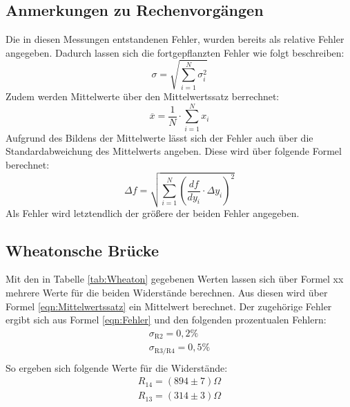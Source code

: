 \documentclass[titlepage = firstcover]{scrartcl}
\begin{document}
  \subsection{Anmerkungen zu Rechenvorgängen}
  Die in diesen Messungen entstandenen Fehler, wurden bereits als relative Fehler angegeben. Dadurch lassen sich die fortgepflanzten Fehler wie folgt 
  beschreiben:
  \begin{equation}
      \sigma = \sqrt{\sum_{i=1}^N \sigma_i^2}
      \label{eqn:Fehler}
  \end{equation}
  Zudem werden Mittelwerte über den Mittelwertssatz berrechnet:
  \begin{equation}
    \overline{x} = \frac{1}{N} \cdot \sum_{i=1}^{N} x_i
    \label{eqn:Mittelwertssatz}
  \end{equation}
  Aufgrund des Bildens der Mittelwerte lässt sich der Fehler auch über die Standardabweichung des Mittelwerts angeben. Diese wird über folgende Formel 
  berechnet:
  \begin{equation} 
    \Delta f = \sqrt{\sum_{i=1}^N (\frac{df}{dy_i}\cdot \Delta y_i)^2}
    \label{eqn:stanni}
  \end{equation} 
  Als Fehler wird letztendlich der größere der beiden Fehler angegeben.

  \subsection{Wheatonsche Brücke}
  Mit den in Tabelle \ref{tab:Wheaton} gegebenen Werten lassen sich über Formel xx mehrere Werte für die beiden Widerstände berechnen. Aus diesen wird über 
  Formel \ref{eqn:Mittelwertssatz} ein Mittelwert berechnet. Der zugehörige Fehler ergibt sich aus Formel \ref{eqn:Fehler} und den folgenden prozentualen
  Fehlern:
  \begin{align*}
      \sigma_{\text{R2}} = 0,2 \% \\
      \sigma_{\text{R3/R4}} = 0,5 \% \\
  \end{align*}
  So ergeben sich folgende Werte für die Widerstände:
  \begin{align*}
      R_{14} = (894 \pm 7) \Omega \\
      R_{13} = (314 \pm 3) \Omega
  \end{align*}
\end{document}
